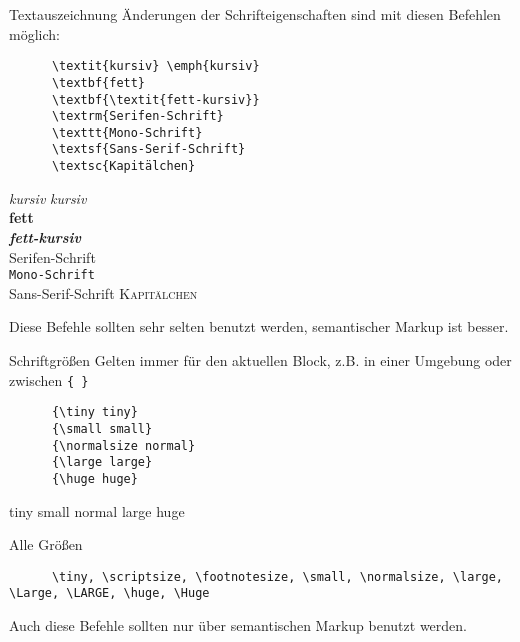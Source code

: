 \begin{frame}[fragile]{Textauszeichnung}
  Änderungen der Schrifteigenschaften sind mit diesen Befehlen möglich:
  \begin{CodeExample}{0.60}
    \begin{lstlisting}
      \textit{kursiv} \emph{kursiv}
      \textbf{fett}
      \textbf{\textit{fett-kursiv}}
      \textrm{Serifen-Schrift}
      \texttt{Mono-Schrift}
      \textsf{Sans-Serif-Schrift}
      \textsc{Kapitälchen}
    \end{lstlisting}
  \CodeResult
    \textit{kursiv} \emph{kursiv} \\
    \textbf{fett} \\
    \textbf{\textit{fett-kursiv}} \\
    \textrm{Serifen-Schrift} \\
    \texttt{Mono-Schrift} \\
    \textsf{Sans-Serif-Schrift}
    \textsc{Kapitälchen}
  \end{CodeExample}

  \vspace{1em}
  Diese Befehle sollten sehr selten benutzt werden, semantischer Markup ist besser.
\end{frame}

\begin{frame}[fragile]{Schriftgrößen}
  Gelten immer für den aktuellen Block, z.B. in einer Umgebung oder zwischen \lstinline+{ }+
  \begin{CodeExample}{0.48}
    \begin{lstlisting}
      {\tiny tiny}
      {\small small}
      {\normalsize normal}
      {\large large}
      {\huge huge}
    \end{lstlisting}
  \CodeResult
    {\tiny tiny}
    {\small small}
    {\normalsize normal}
    {\large large}
    {\huge huge}
  \end{CodeExample}
  \vspace{1em}
  \begin{block}{Alle Größen}
    \begin{lstlisting}
      \tiny, \scriptsize, \footnotesize, \small, \normalsize, \large, \Large, \LARGE, \huge, \Huge
    \end{lstlisting}
  \end{block}
  Auch diese Befehle sollten nur über semantischen Markup benutzt werden.
\end{frame}

